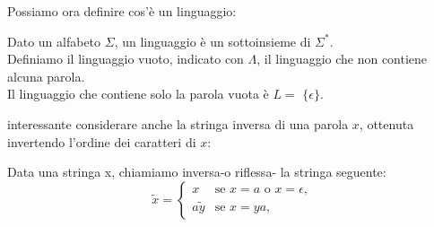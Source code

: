 \documentclass{article}
\begin{document}
Possiamo ora definire cos'è un linguaggio:
\\\noindent
\begin{definition}
Dato un alfabeto $\Sigma$, un linguaggio è un sottoinsieme di $\Sigma^*$.
\\\noindent
Definiamo il linguaggio vuoto, indicato con $\Lambda$, il linguaggio che non contiene alcuna parola.
\\\noindent
Il linguaggio che contiene solo la parola vuota è $L=$ \(\{\epsilon\}\).
\end{definition}
 interessante considerare anche la stringa inversa di una parola \( x \), ottenuta invertendo l'ordine dei caratteri di \( x \):
\begin{definition} 
Data una stringa x, chiamiamo inversa-o riflessa- la stringa seguente:
\[
\tilde{x} =
\begin{cases}
    x & \text{se } x = a \text{ o } x = \epsilon, \\
    a\tilde{y} & \text{se } x = ya,
\end{cases}
\]
\end{definition}
\end{document}
